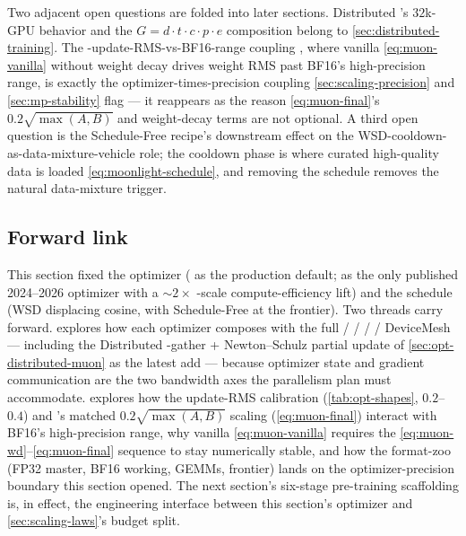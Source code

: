 Two adjacent open questions are folded into later sections.
Distributed 's $32$k-GPU behavior and the $G = d \cdot t \cdot c
\cdot p \cdot e$ composition belong to \cref{sec:distributed-training}.
The -update-RMS-vs-BF16-range coupling
\citep[\S 2.2]{muon-moonlight2025}, where vanilla
\cref{eq:muon-vanilla} without weight decay drives weight RMS past
BF16's high-precision range, is exactly the optimizer-times-precision
coupling \cref{sec:scaling-precision} and \cref{sec:mp-stability}
flag --- it reappears as the reason
\cref{eq:muon-final}'s $0.2\sqrt{\max(A, B)}$ and weight-decay terms
are not optional. A third open question is the Schedule-Free
recipe's downstream effect on the WSD-cooldown-as-data-mixture-vehicle
role; the cooldown phase is where curated high-quality data is
loaded \eqref{eq:moonlight-schedule}, and removing the schedule
removes the natural data-mixture trigger.

\subsection{Forward link}
\label{sec:opt-forward}

This section fixed the optimizer ( as the production default;
 as the only published 2024--2026 optimizer with a $\sim 2\times$
-scale compute-efficiency lift) and the schedule (WSD displacing
cosine, with Schedule-Free at the frontier). Two threads carry
forward.  explores how each optimizer
composes with the full  /  /  /  /  DeviceMesh ---
including the Distributed  -gather + Newton--Schulz partial
update of \cref{sec:opt-distributed-muon} as the latest add ---
because optimizer state and gradient communication are the two
bandwidth axes the parallelism plan must accommodate.
 explores how the 
update-RMS calibration (\cref{tab:opt-shapes}, $0.2$--$0.4$) and
's matched $0.2\sqrt{\max(A, B)}$ scaling
(\cref{eq:muon-final}) interact with BF16's high-precision range,
why vanilla \cref{eq:muon-vanilla} requires the
\cref{eq:muon-wd}--\cref{eq:muon-final} sequence to stay numerically
stable, and how the format-zoo (FP32 master, BF16 working, 
GEMMs,  frontier) lands on the optimizer-precision boundary
this section opened. The next section's six-stage pre-training
scaffolding is, in effect, the engineering interface between this
section's optimizer and \cref{sec:scaling-laws}'s budget split.
